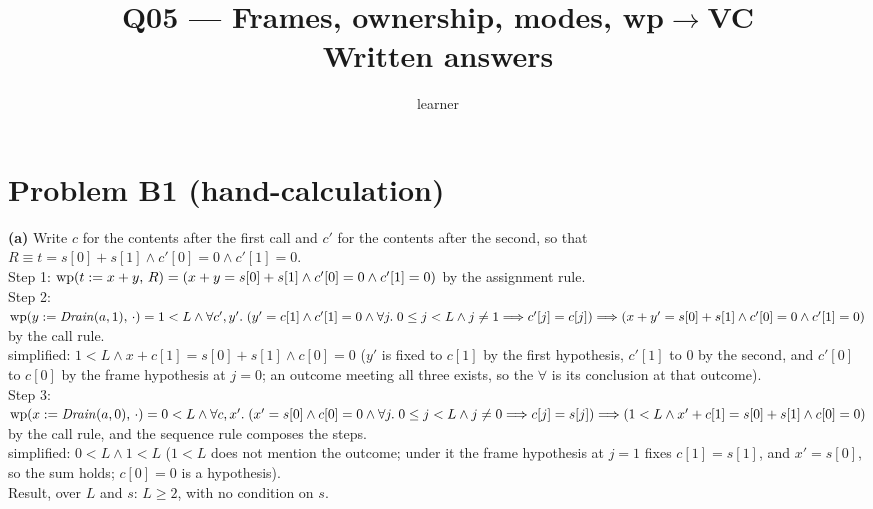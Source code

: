 \documentclass[11pt]{article}
\title{Q05 --- Frames, ownership, modes, wp$\to$VC \\ \large Written answers}
\author{learner}
\date{}
\begin{document}
\maketitle

\section*{Problem B1 (hand-calculation)}\label{ans:B1}
\begin{answer}
\textbf{(a)} Write $c$ for the contents after the first call and $c'$ for the
contents after the second, so that $R \equiv t = s[0] + s[1] \wedge c'[0] = 0
\wedge c'[1] = 0$. \\
Step 1: $\mathrm{wp}(t \mathrel{:=} x + y,\,R) = (x + y = s[0] + s[1] \wedge c'[0] = 0
\wedge c'[1] = 0)$ \quad by the assignment rule. \\
Step 2: $\mathrm{wp}(y \mathrel{:=} \mathit{Drain}(a, 1),\,\cdot) = 1 < L \wedge \forall c',
y' .\; (y' = c[1] \wedge c'[1] = 0 \wedge \forall j .\; 0 \leq j < L \wedge j
\neq 1 \Longrightarrow c'[j] = c[j]) \Longrightarrow (x + y' = s[0] + s[1] \wedge c'[0] = 0 \wedge
c'[1] = 0)$ \quad by the call rule. \\
\hspace*{2em} simplified: $1 < L \wedge x + c[1] = s[0] + s[1] \wedge c[0] = 0$
\quad ($y'$ is fixed to $c[1]$ by the first hypothesis, $c'[1]$ to $0$ by the
second, and $c'[0]$ to $c[0]$ by the frame hypothesis at $j = 0$; an outcome
meeting all three exists, so the $\forall$ is its conclusion at that
outcome). \\
Step 3: $\mathrm{wp}(x \mathrel{:=} \mathit{Drain}(a, 0),\,\cdot) = 0 < L \wedge \forall c,
x' .\; (x' = s[0] \wedge c[0] = 0 \wedge \forall j .\; 0 \leq j < L \wedge j
\neq 0 \Longrightarrow c[j] = s[j]) \Longrightarrow (1 < L \wedge x' + c[1] = s[0] + s[1] \wedge
c[0] = 0)$ \quad by the call rule, and the sequence rule composes the
steps. \\
\hspace*{2em} simplified: $0 < L \wedge 1 < L$ \quad ($1 < L$ does not mention
the outcome; under it the frame hypothesis at $j = 1$ fixes $c[1] = s[1]$, and
$x' = s[0]$, so the sum holds; $c[0] = 0$ is a hypothesis). \\
Result, over $L$ and $s$: $L \geq 2$, with no condition on $s$.


\end{answer}
\end{document}
